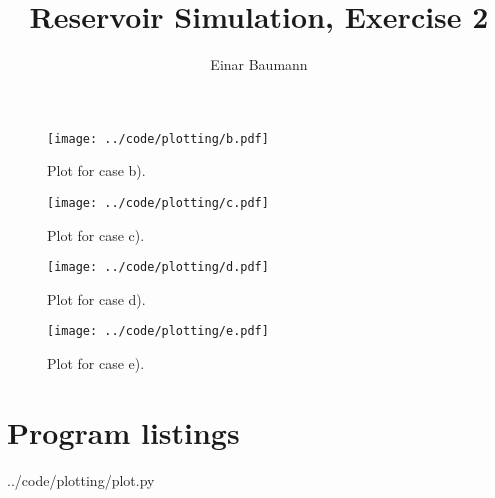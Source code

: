 





\title{Reservoir Simulation, Exercise 2}
\author{Einar Baumann}
\maketitle
\thispagestyle{empty}
\pagebreak


\begin{figure}[H]
  \centering
  \texttt{[image: ../code/plotting/b.pdf]}
  \caption{Plot for case b).}
  \label{fig:caseb}
\end{figure}

\begin{figure}[H]
  \centering
  \texttt{[image: ../code/plotting/c.pdf]}
  \caption{Plot for case c).}
  \label{fig:casec}
\end{figure}

\begin{figure}[H]
  \centering
  \texttt{[image: ../code/plotting/d.pdf]}
  \caption{Plot for case d).}
  \label{fig:cased}
\end{figure}

\begin{figure}[H]
  \centering
  \texttt{[image: ../code/plotting/e.pdf]}
  \caption{Plot for case e).}
  \label{fig:casee}
\end{figure}




\section{Program listings} %
\label{sec:program_listings}


  {../code/plotting/plot.py}


